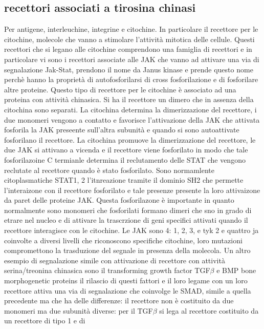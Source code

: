 \subsection{recettori associati a tirosina chinasi}
Per antigene, interleuchine, integrine e citochine. In particolare il recettore per le citochine, molecole che vanno a stimolare l'attivit\`a mitotica delle cellule. Questi recettori 
che si legano alle citochine comprendono una famiglia di recettori e in particolare vi sono i recettori associate alle JAK che vanno ad attivare una via di segnalazione Jak-Stat, prendono
il nome da Janus kinase e prende questo nome perch\`e hanno la propriet\`a di autofosforilarsi di cross fosforilazione e di fosforilare altre proteine. Questo tipo di recettore per le 
citochine \`e associato ad una proteina con attivit\`a chinasica. Si ha il recettore un dimero che in assenza della citochina sono separati. La citochina determina la dimerizzazione del
recettore, i due monomeri vengono a contatto e favorisce l'attivazione della JAK che attivata fosforila la JAK preseente sull'altra subunit\`a e quando si sono autoattivate fosforilano 
il recettore. La citochina promuove la dimerizzazione del recettore, le due JAK si attivano a vicenda e il recettore viene fosforilato in modo che tale fosforilazoine C termianle 
determina il reclutamento delle STAT che vengono reclutate al recettore quando \`e stato fosforilato. Sono normamlente citoplasmatiche STAT1, 2 l'itnreazione tramite il dominio SH2 che
permette l'interaizone con il recettore fosforilato e tale presenze presente la loro attivaizone da paret delle proteine JAK. Questa fosforilazone \`e importante in quanto normalmente 
sono monomeri che fosforilati formano dimeri che sno in grado di etrare nel nucleo e di attivare la trascrzione di geni specifici attivati quando il recettore interagisce con le 
citochine. Le JAK sono 4: 1, 2, 3, e tyk 2 e quattro ja coinvolte a diversi livelli che riconoscono specifiche citochine, loro mutazioni compromettono la trasduzione del segnale in 
presenza della molecola. Un altro esempio di segnalazione simile con attivazione di recettore con attivit\`a serina/treonina chinasica sono il transforming growth factor TGF$\beta$ e 
BMP bone morphogenetic proteins il rilascio di questi fattori e il loro legame con un loro recettore attiva una via di segnalazione che coinvolge le SMAD, simile a quella precedente
ma che ha delle differenze: il recettore non \`e costituito da due monomeri ma due subunit\`a diverse: per il TGF$\beta$ si lega al recettore costituito da un recettore di tipo 1 e di 
